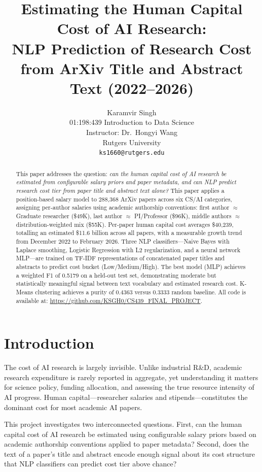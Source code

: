 \documentclass{article}
\title{Estimating the Human Capital Cost of AI Research:\\
NLP Prediction of Research Cost from ArXiv Title and Abstract Text (2022--2026)}
\author{%
  Karamvir Singh \\
  01:198:439 Introduction to Data Science \\
  Instructor: Dr.\ Hongyi Wang \\
  Rutgers University \\
  \texttt{ks1660@rutgers.edu}
}
\begin{document}
\maketitle

\begin{abstract}
This paper addresses the question: \emph{can the human capital cost of AI research be estimated from configurable salary priors and paper metadata, and can NLP predict research cost tier from paper title and abstract text alone?} This paper applies a position-based salary model to 288,368 ArXiv papers across six CS/AI categories, assigning per-author salaries using academic authorship conventions: first author $\approx$ Graduate researcher (\$49K), last author $\approx$ PI/Professor (\$96K), middle authors $\approx$ distribution-weighted mix (\$55K). Per-paper human capital cost averages \$40,239, totalling an estimated \$11.6 billion across all papers, with a measurable growth trend from December 2022 to February 2026. Three NLP classifiers---Naive Bayes with Laplace smoothing, Logistic Regression with L2 regularization, and a neural network MLP---are trained on TF-IDF representations of concatenated paper titles and abstracts to predict cost bucket (Low/Medium/High). The best model (MLP) achieves a weighted F1 of 0.5179 on a held-out test set, demonstrating moderate but statistically meaningful signal between text vocabulary and estimated research cost. K-Means clustering achieves a purity of 0.4363 versus 0.3333 random baseline. All code is available at: \url{https://github.com/KSGH0/CS439\_FINAL\_PROJECT}.
\end{abstract}

\newpage

\section{Introduction}

The cost of AI research is largely invisible. Unlike industrial R\&D, academic research expenditure is rarely reported in aggregate, yet understanding it matters for science policy, funding allocation, and assessing the true resource intensity of AI progress. Human capital---researcher salaries and stipends---constitutes the dominant cost for most academic AI papers.

This project investigates two interconnected questions. First, can the human capital cost of AI research be estimated using configurable salary priors based on academic authorship conventions applied to paper metadata? Second, does the text of a paper's title and abstract encode enough signal about its cost structure that NLP classifiers can predict cost tier above chance?
\end{document}
